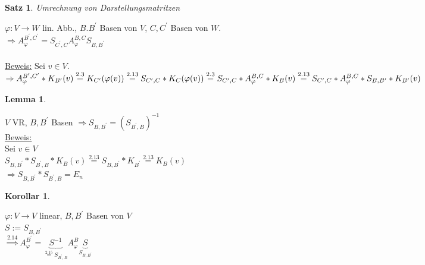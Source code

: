 \documentclass[a4paper,11pt]{article}
\newtheorem{satz}[definition]{Satz}
\newtheorem{koro}[definition]{Korollar}
\newtheorem{lemma}[definition]{Lemma}
\begin{document}
\begin{satz}
	Umrechnung von Darstellungsmatritzen
\end{satz}
$\varphi\colon V\to W$ lin. Abb., $B.B^\prime$ Basen von $V$, $C,C^\prime$ Basen von $W$. \\
$\Rightarrow A^{B^\prime,C^\prime}_\varphi=S_{C^\prime,C}A^{B,C}_\varphi S_{B,B^\prime}$ \\
\\
\underline{Beweis:}
Sei $v\in V$. \\
$\Rightarrow A^{B^\prime, C^\prime}_\varphi * K_{B^\prime}(v)\overset{2.3}{=}K_{C^\prime}(\varphi(v)) \\
\overset{2.13}{=}S_{C^\prime, C}*K_C(\varphi(v)) \\
\overset{2.3}{=}S_{C^\prime, C}*A^{B,C}_\varphi*K_B(v) \\
\overset{2.13}{=}S_{C^\prime, C}*A^{B,C}_\varphi*S_{B,B^\prime}*K_{B^\prime}(v)$

\begin{lemma}
\end{lemma}
$V$ VR, $B,B^\prime$ Basen $\Rightarrow S_{B,B^\prime}=(S_{B^\prime, B})^{-1}$ \\
\underline{Beweis:} \\
Sei $v\in V$ \\
$S_{B,B^\prime}*S_{B^\prime,B}*K_B(v)\overset{2.13}{=}S_{B,B^\prime}*K_{B^\prime}\overset{2.13}{=}K_B(v)$ \\
$\Rightarrow S_{B,B^\prime}*S_{B^\prime,B}=E_n$

\begin{koro}
\end{koro}
$\varphi\colon V\to V$ linear, $B,B^\prime$ Basen von $V$ \\
$S:=S_{B,B^\prime}$ \\
$\overset{2.14}{\Rightarrow}A^{B^\prime}_\varphi=\underbrace{S^{-1}}_{\overset{2.15}{=}S_{B^\prime,B}}A^B_\varphi\underbrace{S}_{S_{B,B^\prime}}$

\newpage
\end{document}

